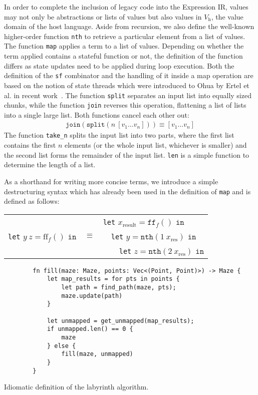 In order to complete the inclusion of legacy code into the Expression IR, values may not only be abstractions or lists of values but also values in $V_\text{h}$, the value domain of the host language.
Aside from recursion, we also define the well-known higher-order function \texttt{nth} to retrieve a particular element from a list of values.
The function \texttt{map} applies a term to a list of values.
Depending on whether the term applied contains a stateful function or not, the definition of the function differs as state updates need to be applied during loop execution.
Both the definition of the \texttt{sf} combinator and the handling of it inside a map operation are based on the notion of state threads which were introduced to Ohua by Ertel et al. in recent work~\cite{ertel2019stclang}.
The function \texttt{split} separates an input list into equally sized chunks, while the function \texttt{join} reverses this operation, flattening a list of lists into a single large list.
Both functions cancel each other out:
\begin{align*}
    \texttt{join}(\texttt{split}(n \ [v_1 \dots v_n])) \equiv [v_1 \dots v_n]
\end{align*}
The function \texttt{take\_n} splits the input list into two parts, where the first list contains the first $n$ elements (or the whole input list, whichever is smaller) and the second list forms the remainder of the input list.
\texttt{len} is a simple function to determine the length of a list.

As a shorthand for writing more concise terms, we introduce a simple destructuring syntax which has already been used in the definition of \texttt{map} and is defined as follows:
\begin{center}
    \begin{tabular}{l c l}
        && \texttt{let} $x_{\text{result}} = \texttt{ff}_f() \texttt{ in}$\\
        \texttt{let} $y\ z = \text{ff}_f() \texttt{ in}$ & $\equiv$ & \ \ \texttt{let} $y = \texttt{nth}(1\ x_{\text{res}}) \texttt{ in}$\\
        && \ \ \ \ \texttt{let} $z = \texttt{nth}(2\ x_{\text{res}}) \texttt{ in}$\\
    \end{tabular}
\end{center}

\begin{listing}[!b]
    \begin{verbatim}
        fn fill(maze: Maze, points: Vec<(Point, Point)>) -> Maze {
            let map_results = for pts in points {
                let path = find_path(maze, pts);
                maze.update(path)
            }

            let unmapped = get_unmapped(map_results);
            if unmapped.len() == 0 {
                maze
            } else {
                fill(maze, unmapped)
            }
        }
    \end{verbatim}
    \caption{Idiomatic definition of the labyrinth algorithm.}%
    \label{fig:transformations:idiomatic}
\end{listing}

